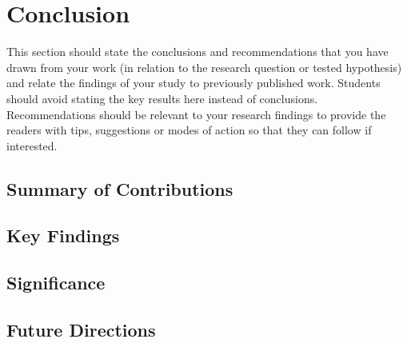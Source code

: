 \chapter{Conclusion}

This section should state the conclusions and recommendations that you have drawn from your work (in relation to the research question or tested hypothesis) and relate the findings of your study to previously published work. Students should avoid stating the key results here instead of conclusions. Recommendations should be relevant to your research findings to provide the readers with tips, suggestions or modes of action so that they can follow if interested.

\section{Summary of Contributions}


\section{Key Findings}


\section{Significance}


\section{Future Directions}



